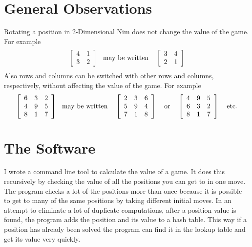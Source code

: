 \documentclass[11pt]{article}
\begin{document}
\section{General Observations}
Rotating a position in 2-Dimensional Nim does not change the value of the game.  For example
$$
\left[
\begin{array}{ c c }
4 & 1 \\
3 & 2
\end{array}
\right]
\mbox{\hspace{0.1in}may be written \hspace{0.1in}}
\left[
\begin{array}{ c c}
3 & 4 \\
2 & 1
\end{array}
\right]
$$
Also rows and columns can be switched with other rows and columns, respectively, without affecting the value of the game.  For example
$$
\left[
\begin{array}{ c c c}
6 & 3 & 2 \\
4 & 9 & 5 \\
8 & 1 & 7
\end{array}
\right]
\mbox{\hspace{0.1in}may be written \hspace{0.1in}}
\left[
\begin{array}{ c c c }
2 & 3 & 6 \\
5 & 9 & 4 \\
7 & 1 & 8 \\
\end{array}
\right]
\mbox{\hspace{0.1in} or \hspace{0.1in}}
\left[
\begin{array}{ c c c}
4 & 9 & 5 \\
6 & 3 & 2 \\
8 & 1 & 7
\end{array}
\right]
\mbox{\hspace{0.1in} etc.}
$$


\section{The Software}
I wrote a command line tool to calculate the value of a game.  It does this recursively by checking the value of all the positions you can get to in one move.  The program checks a lot of the positions more than once because it is possible to get to many of the same positions by taking different initial moves.  In an attempt to eliminate a lot of duplicate computations, after a position value is found, the program adds the position and its value to a hash table.  This way if a position has already been solved the program can find it in the lookup table and get its value very quickly.
\end{document}
